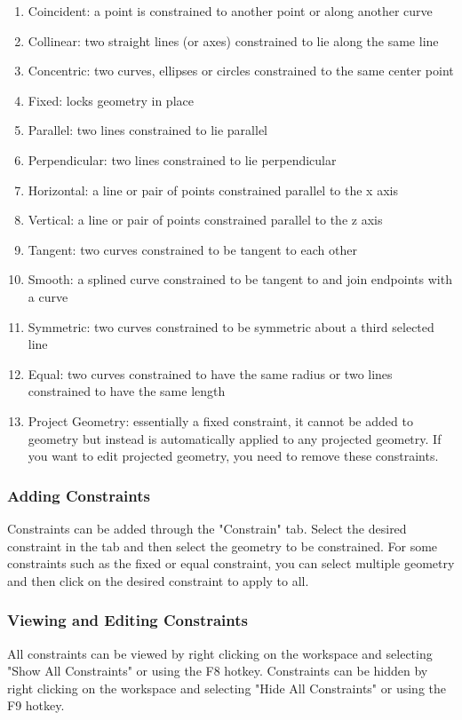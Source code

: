 \begin{enumerate}
\item Coincident: a point is constrained to another point or along another curve
\item Collinear: two straight lines (or axes) constrained to lie along the same line
\item Concentric: two curves, ellipses or circles constrained to the same center point
\item Fixed: locks geometry in place
\item Parallel: two lines constrained to lie parallel
\item Perpendicular: two lines constrained to lie perpendicular
\item Horizontal: a line or pair of points constrained parallel to the x axis
\item Vertical: a line or pair of points constrained parallel to the z axis
\item Tangent: two curves constrained to be tangent to each other
\item Smooth: a splined curve constrained to be tangent to and join endpoints with a curve
\item Symmetric: two curves constrained to be symmetric about a third selected line
\item Equal: two curves constrained to have the same radius or two lines constrained to have the same length
\item Project Geometry: essentially a fixed constraint, it cannot be added to geometry but instead is automatically applied to any projected geometry. If you want to edit projected geometry, you need to remove these constraints.
\end{enumerate}

\subsubsection{Adding Constraints}
Constraints can be added through the "Constrain" tab. Select the desired constraint in the tab and then select the geometry to be constrained. For some constraints such as the fixed or equal constraint, you can select multiple geometry and then click on the desired constraint to apply to all.

\subsubsection{Viewing and Editing Constraints}
All constraints can be viewed by right clicking on the workspace and selecting "Show All Constraints" or using the F8 hotkey. Constraints can be hidden by right clicking on the workspace and selecting "Hide All Constraints" or using the F9 hotkey.

